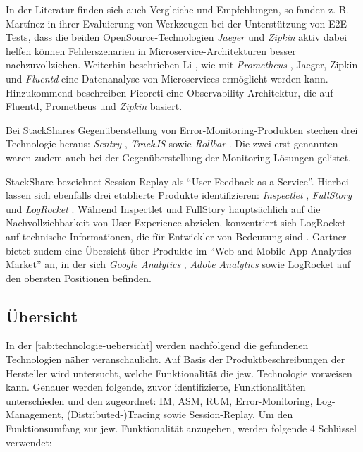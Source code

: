 In der Literatur finden sich auch Vergleiche und Empfehlungen, so fanden z. B. Mart{\'i}nez \etal \cite{ComparisonOfE2ETestingToolsForMicroservices} in ihrer Evaluierung von Werkzeugen bei der Unterstützung von E2E-Tests, dass die beiden OpenSource-Technologien \textit{Jaeger} \cite{Jaeger} und \textit{Zipkin} \cite{Zipkin} aktiv dabei helfen können Fehlerszenarien in Microservice-Architekturen besser nachzuvollziehen. Weiterhin beschrieben Li \etal \cite{ServiceMeshChallengesStateOfTheArt}, wie mit \textit{Prometheus} \cite{Prometheus}, Jaeger, Zipkin und \textit{Fluentd} \cite{Fluentd} eine Datenanalyse von Microservices ermöglicht werden kann. Hinzukommend beschreiben Picoreti \etal \cite{MultilevelObservabilityInCloudOrchestration} eine Observability-Architektur, die auf Fluentd, Prometheus und \textit{Zipkin} basiert.

Bei StackShares Gegenüberstellung von Error-Monitoring-Produkten \cite{StackShareExceptionMonitoring} stechen drei Technologie heraus: \textit{Sentry} \cite{Sentry}, \textit{TrackJS} \cite{TrackJS} sowie \textit{Rollbar} \cite{Rollbar}. Die zwei erst genannten waren zudem auch bei der Gegenüberstellung der Monitoring-Lösungen \cite{StackShareMonitoring} gelistet.

StackShare bezeichnet Session-Replay als \enquote{User-Feedback-as-a-Service}. Hierbei \cite{StackShareUserFeedbackAsAService} lassen sich ebenfalls drei etablierte Produkte identifizieren: \textit{Inspectlet} \cite{Inspectlet}, \textit{FullStory} \cite{FullStory} und \textit{LogRocket} \cite{LogRocket}. Während Inspectlet und FullStory hauptsächlich auf die Nachvollziehbarkeit von User-Experience abzielen, konzentriert sich LogRocket auf technische Informationen, die für Entwickler von Bedeutung sind \cite{Webalyt}. Gartner bietet zudem eine Übersicht \cite{GartnerWebAndMobileAppAnalytics} über Produkte im \enquote{Web and Mobile App Analytics Market} an, in der sich \textit{Google Analytics} \cite{GoogleAnalytics}, \textit{Adobe Analytics} \cite{AdobeAnalytics} sowie LogRocket auf den obersten Positionen befinden.

\subsection{Übersicht}

In der \autoref{tab:technologie-uebersicht} werden nachfolgend die gefundenen Technologien näher veranschaulicht. Auf Basis der Produktbeschreibungen der Hersteller wird untersucht, welche Funktionalität die jew. Technologie vorweisen kann. Genauer werden folgende, zuvor identifizierte, Funktionalitäten unterschieden und den zugeordnet: IM, ASM, RUM, Error-Monitoring, Log-Management, (Distributed-)Tracing sowie Session-Replay. Um den Funktionsumfang zur jew. Funktionalität anzugeben, werden folgende 4 Schlüssel verwendet:

